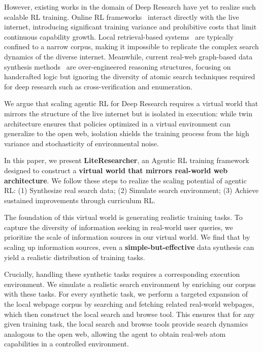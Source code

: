 \documentclass{article} %
\theoremstyle{plain}
\theoremstyle{definition}
\theoremstyle{remark}
\begin{document}
However, existing works in the domain of Deep Research have yet to realize such scalable RL training. Online RL frameworks~\citep{zheng2025deepresearcher,li2025webthinker} interact directly with the live internet, introducing significant training variance and prohibitive costs that limit continuous capability growth. Local retrieval-based systems~\citep{jin2025search,li2025search,sun2025zerosearch} are typically confined to a narrow corpus, making it impossible to replicate the complex search dynamics of the diverse internet. Meanwhile, current real-web graph-based data synthesis methods~\citep{jin2025search,li2025websailor,gao2025beyond} are over-engineered reasoning structures, focusing on handcrafted logic but ignoring the diversity of atomic search techniques required for deep research such as cross-verification and enumeration.

 We argue that scaling agentic RL for Deep Research requires a virtual world that mirrors the structure of the live internet but is isolated in execution: while twin architecture ensures that policies optimized in a virtual environment can generalize to the open web, isolation shields the training process from the high variance and stochasticity of environmental noise.
 
In this paper, we present \textbf{LiteResearcher}, an Agentic RL training framework designed to construct a \textbf{virtual world that mirrors real-world web architecture}. We follow these steps to realize the scaling potential of agentic RL: (1) Synthesize real search data; (2) Simulate search environment; (3) Achieve sustained improvements through curriculum RL. 

The foundation of this virtual world is generating realistic training tasks. To capture the diversity of information seeking in real-world user queries, we prioritize the scale of information sources in our virtual world. We find that by scaling up information sources, even a \textbf{simple-but-effective} data synthesis can yield a realistic distribution of training tasks. 

Crucially, handling these synthetic tasks requires a corresponding execution environment. We simulate a realistic search environment by enriching our corpus with these tasks. For every synthetic task, we perform a targeted expansion of the local webpage corpus by searching and fetching related real-world webpages, which then construct the local search and browse tool. This ensures that for any given training task, the local search and browse tools provide search dynamics analogous to the open web, allowing the agent to obtain real-web atom capabilities in a controlled environment.
\end{document}

